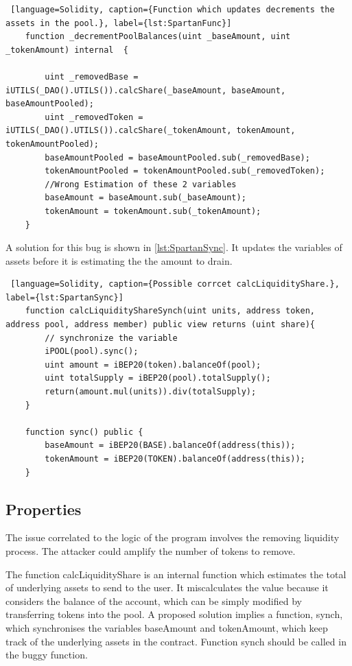 \begin{lstlisting} [language=Solidity, caption={Function which updates decrements the assets in the pool.}, label={lst:SpartanFunc}]
    function _decrementPoolBalances(uint _baseAmount, uint _tokenAmount) internal  {
        
        uint _removedBase = iUTILS(_DAO().UTILS()).calcShare(_baseAmount, baseAmount, baseAmountPooled);
        uint _removedToken = iUTILS(_DAO().UTILS()).calcShare(_tokenAmount, tokenAmount, tokenAmountPooled);
        baseAmountPooled = baseAmountPooled.sub(_removedBase);
        tokenAmountPooled = tokenAmountPooled.sub(_removedToken); 
        //Wrong Estimation of these 2 variables
        baseAmount = baseAmount.sub(_baseAmount);
        tokenAmount = tokenAmount.sub(_tokenAmount); 
    }
\end{lstlisting}
A solution for this bug is shown in \autoref{lst:SpartanSync}. It updates the variables of assets before it is estimating the 
the amount to drain.
\begin{lstlisting} [language=Solidity, caption={Possible corrcet calcLiquidityShare.}, label={lst:SpartanSync}]
    function calcLiquidityShareSynch(uint units, address token, address pool, address member) public view returns (uint share){
        // synchronize the variable
        iPOOL(pool).sync();  
        uint amount = iBEP20(token).balanceOf(pool);
        uint totalSupply = iBEP20(pool).totalSupply();
        return(amount.mul(units)).div(totalSupply);
    }

    function sync() public {
        baseAmount = iBEP20(BASE).balanceOf(address(this));
        tokenAmount = iBEP20(TOKEN).balanceOf(address(this));
    }
\end{lstlisting}

\subsection{Properties}
The issue correlated to the logic of the program involves the removing liquidity process. 
The attacker could amplify the number of tokens to remove.

The function calcLiquidityShare is an internal function which estimates the total of underlying assets to send to the user. 
It miscalculates the value because it considers the balance of the account, which can be simply modified by transferring tokens into the pool.
A proposed solution implies a function, synch, which synchronises the variables baseAmount and tokenAmount, which keep track of the underlying assets in the contract. 
Function synch should be called in the buggy function.


